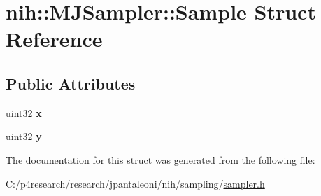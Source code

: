 \hypertarget{structnih_1_1_m_j_sampler_1_1_sample}{
\section{nih\-:\-:\-M\-J\-Sampler\-:\-:\-Sample \-Struct \-Reference}
\label{structnih_1_1_m_j_sampler_1_1_sample}
}
\subsection*{\-Public \-Attributes}
\begin{DoxyCompactItemize}
\item 
\hypertarget{structnih_1_1_m_j_sampler_1_1_sample_ad37783a6dc7fb42cfe969246ff24054e}{
uint32 {\bfseries x}}
\label{structnih_1_1_m_j_sampler_1_1_sample_ad37783a6dc7fb42cfe969246ff24054e}

\item 
\hypertarget{structnih_1_1_m_j_sampler_1_1_sample_a1689fb7c3efb85a2ac4832dad0a73007}{
uint32 {\bfseries y}}
\label{structnih_1_1_m_j_sampler_1_1_sample_a1689fb7c3efb85a2ac4832dad0a73007}

\end{DoxyCompactItemize}


\-The documentation for this struct was generated from the following file\-:\begin{DoxyCompactItemize}
\item 
\-C\-:/p4research/research/jpantaleoni/nih/sampling/\hyperlink{sampler_8h}{sampler.\-h}\end{DoxyCompactItemize}
